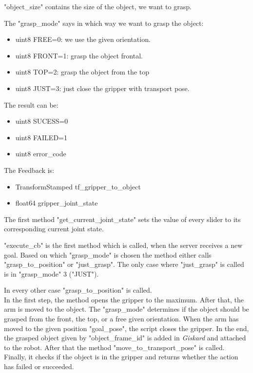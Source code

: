 \documentclass[main.tex]{subfiles}
\begin{document}
			\vspace{0,25 cm}
			"object\_size" contains the size of the object, we want to grasp.
			
			\vspace{0,25 cm}
			The "grasp\_mode" says in which way we want to grasp the object:
			\begin{itemize}
			 \item uint8 FREE=0: we use the given orientation.
			 \item uint8 FRONT=1: grasp the object frontal.
			 \item uint8 TOP=2: grasp the object from the top
			 \item uint8 JUST=3: just close the gripper with transport pose.
			 \end{itemize}
			 \vspace{0,75 cm}
			 The result can be:
			 \begin{itemize}
			 	\item uint8 SUCESS=0
			 	\item uint8 FAILED=1
			 	\item uint8 error\_code
			 \end{itemize}
		 
			\vspace{0,75 cm}
			The Feedback is:
			\begin{itemize}
				\item TransformStamped tf\_gripper\_to\_object
				\item float64 gripper\_joint\_state
			\end{itemize}
			 
			 \vspace{0,75 cm}
			 The first method "get\_current\_joint\_state"  sets the value of every slider to its corresponding current joint state.
			 
			 \vspace{0,25 cm}
			 "execute\_cb" is the first method which is called, when the server receives a new goal. Based on which "grasp\_mode" is chosen the method either calls "grasp\_to\_position" or "just\_grasp". The only case where "just\_grasp" is called is in "grasp\_mode" 3 ("JUST").
			 
			 \vspace{0,25 cm}
			 In every other case "grasp\_to\_position" is called.\\
			In the first step, the method opens the gripper to the maximum. After that, the arm is moved to the object. The "grasp\_mode" determines if the object should be grasped from the front, the top, or a free given orientation. When the arm has moved to the given position "goal\_pose", the script closes the gripper. In the end, the grasped object given by "object\_frame\_id" is added in \textit{Giskard} and attached to the robot. After that the method "move\_to\_transport\_pose" is called.\\
			Finally, it checks if the object is in the gripper and returns whether the action has failed or succeeded.
			
\end{document}
